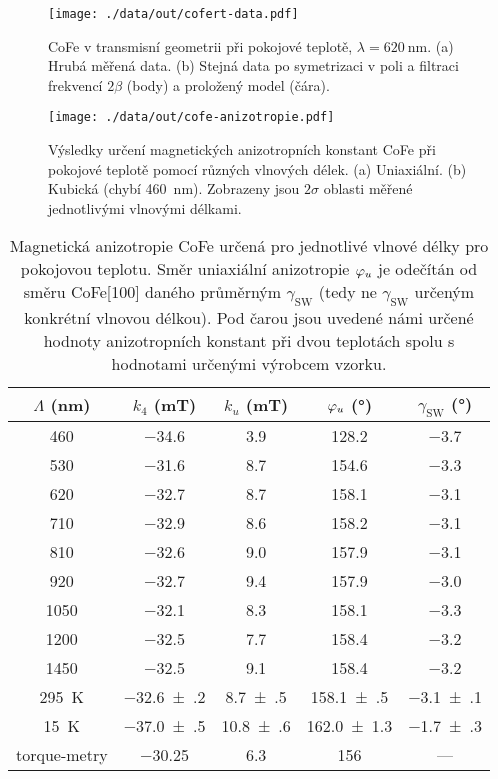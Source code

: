 \begin{figure}[htbp]
    \centering
    \texttt{[image: ./data/out/cofert-data.pdf]}
    \caption{CoFe v transmisní geometrii při pokojové teplotě, $\lambda=\SI{620}{\nano\meter}$. (a) Hrubá měřená data. (b) Stejná data po symetrizaci v poli a filtraci frekvencí $2\beta$ (body) a proložený model (čára).}
    \label{fig:vysledky-cofe-data}
\end{figure}

\begin{figure}[htbp]
    \centering
    \texttt{[image: ./data/out/cofe-anizotropie.pdf]}
    \caption{Výsledky určení magnetických anizotropních konstant CoFe při pokojové teplotě pomocí různých vlnových délek. (a) Uniaxiální. (b) Kubická (chybí \SI{460}{\nano\meter}). Zobrazeny jsou $2\sigma$ oblasti měřené jednotlivými vlnovými délkami.}
    \label{fig:vysledky-cofe-roomt-anizotropie}
\end{figure}

\begin{table}[tp]
    \centering
    \begin{tabular}{ccccc}
        \toprule
        $\Lambda$ (\si{\nano\meter}) & $k_4$ (\si{\milli\tesla}) & $k_u$ (\si{\milli\tesla}) & $\varphi_u$ (\si{\degree}) & $\gamma_\textrm{SW}$ (\si{\degree}) \\ \midrule[\heavyrulewidth]
        \num{460} & \num{-34.6} & \num{3.9} & \num{128.2} & \num{-3.7} \\
\num{530} & \num{-31.6} & \num{8.7} & \num{154.6} & \num{-3.3} \\
\num{620} & \num{-32.7} & \num{8.7} & \num{158.1} & \num{-3.1} \\
\num{710} & \num{-32.9} & \num{8.6} & \num{158.2} & \num{-3.1} \\
\num{810} & \num{-32.6} & \num{9.0} & \num{157.9} & \num{-3.1} \\
\num{920} & \num{-32.7} & \num{9.4} & \num{157.9} & \num{-3.0} \\
\num{1050} & \num{-32.1} & \num{8.3} & \num{158.1} & \num{-3.3} \\
\num{1200} & \num{-32.5} & \num{7.7} & \num{158.4} & \num{-3.2} \\
\num{1450} & \num{-32.5} & \num{9.1} & \num{158.4} & \num{-3.2} \\ \midrule[\heavyrulewidth]
        \SI{295}{\kelvin} & \num{-32.6(2)} & \num{8.7(5)} & \num{158.1(5)} & \num{-3.1(1)} \\
        \SI{15}{\kelvin} & \num{-37.0(5)} & \num{10.8(6)} & \num{162.0(13)} & \num{-1.7(3)} \\
        torque-metry & \num{-30.25} & \num{6.3} & \num{156} & --- \\
        \bottomrule 
    \end{tabular} 
    \caption{Magnetická anizotropie CoFe určená pro jednotlivé vlnové délky pro pokojovou teplotu. Směr uniaxiální anizotropie $\varphi_u$ je odečítán od směru CoFe[100] daného průměrným $\gamma_\textrm{SW}$ (tedy ne $\gamma_\textrm{SW}$ určeným konkrétní vlnovou délkou). Pod čarou jsou uvedené námi určené hodnoty anizotropních konstant při dvou teplotách spolu s hodnotami určenými výrobcem vzorku.}
    \label{tab:cofe-anizotropie}
\end{table}

